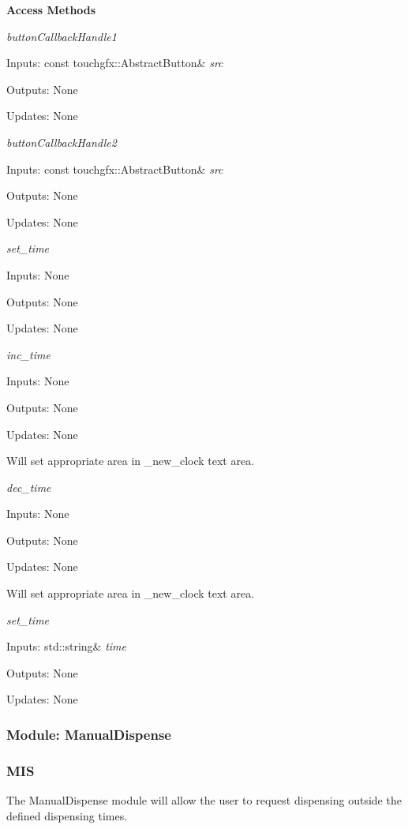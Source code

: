 \documentclass[12pt,titlepage]{article}
\begin{document}
\noindent \textbf{Access Methods} 

\textit{buttonCallbackHandle1} \par
Inputs: const touchgfx::AbstractButton& \textit{src} \par
Outputs: None \par
Updates: None \newline

\textit{buttonCallbackHandle2} \par
Inputs: const touchgfx::AbstractButton& \textit{src} \par
Outputs: None \par
Updates: None \newline

\textit{set\_time} \par
Inputs: None \par
Outputs: None \par
Updates: None \newline

\textit{inc\_time} \par
Inputs: None \par
Outputs: None \par
Updates: None \newline

Will set appropriate area in \_new\_clock text area. \newline

\textit{dec\_time} \par
Inputs: None \par
Outputs: None \par
Updates: None \newline

Will set appropriate area in \_new\_clock text area.

\textit{set\_time} \par
Inputs: std::string& \textit{time} \par
Outputs: None \par
Updates: None \newline


\subsubsection{Module: ManualDispense}
\subsubsection*{MIS}

\noindent The ManualDispense module will allow the user to request dispensing outside the defined dispensing times.  \\
\end{document}
